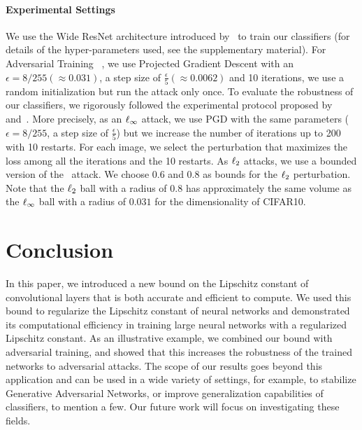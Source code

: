 \paragraph{Experimental Settings}
We use the Wide ResNet architecture introduced by~\cite{zagoruyko2016wide} to train our classifiers (for details of the hyper-parameters used, see the supplementary material).
For Adversarial Training ~\cite{madry2018towards}, we use Projected Gradient Descent with an $\epsilon = 8/255 (\approx 0.031)$, a step size of $\textstyle \frac{\epsilon}{5} (\approx 0.0062)$ and 10 iterations, we use a random initialization but run the attack only once.
To evaluate the robustness of our classifiers, we rigorously followed the experimental protocol proposed by~\cite{tramer2020adaptive} and~\cite{carlini2019evaluating}.
More precisely, as an $\ell_\infty$ attack, we use PGD with the same parameters ($\epsilon = 8/255$, a step size of $\textstyle \frac{\epsilon}{5}$) but we increase the number of iterations up to 200 with 10 restarts.
For each image, we select the perturbation that maximizes the loss among all the iterations and the 10 restarts.
As $\ell_2$ attacks, we use a bounded version of the~\cite{carlini2017towards} attack.
We choose $0.6$ and $0.8$ as bounds for the $\ell_2$ perturbation. Note that the $\ell_2$ ball with a radius of $0.8$ has approximately the same volume as the $\ell_\infty$ ball with a radius of $0.031$ for the dimensionality of CIFAR10. 

\section{Conclusion}
\label{sec:conclusion}

In this paper, we introduced a new bound on the Lipschitz constant of convolutional layers that is both accurate and efficient to compute.
We used this bound to regularize the Lipschitz constant of neural networks and demonstrated its computational efficiency in training large neural networks with a regularized Lipschitz constant.
As an illustrative example, we   combined our bound with adversarial training, and showed that this increases the robustness of the trained networks to  adversarial attacks.
The scope of our results goes beyond this application and can be used  in a wide variety of settings, for example, to stabilize Generative Adversarial Networks, or improve generalization capabilities of classifiers, to mention a few.
Our future work will focus on investigating these fields. 



